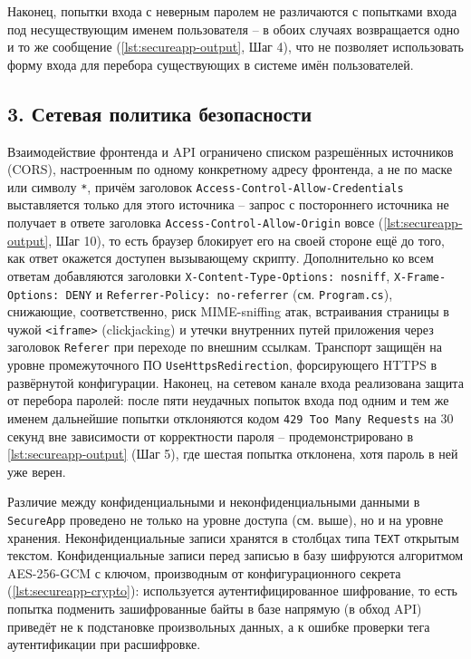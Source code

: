 Наконец, попытки входа с неверным паролем не различаются с попытками входа
под несуществующим именем пользователя -- в обоих случаях возвращается
одно и то же сообщение (\autoref{lst:secureapp-output}, Шаг 4), что не
позволяет использовать форму входа для перебора существующих в системе
имён пользователей.

\subsection*{3. Сетевая политика безопасности}

Взаимодействие фронтенда и API ограничено списком разрешённых источников
(CORS), настроенным по одному конкретному адресу фронтенда, а не по маске
или символу \texttt{*}, причём заголовок
\texttt{Access-Control-Allow-Credentials} выставляется только для этого
источника -- запрос с постороннего источника не получает в ответе заголовка
\texttt{Access-Control-Allow-Origin} вовсе (\autoref{lst:secureapp-output},
Шаг 10), то есть браузер блокирует его на своей стороне ещё до того, как
ответ окажется доступен вызывающему скрипту. Дополнительно ко всем ответам
добавляются заголовки \texttt{X-Content-Type-Options: nosniff},
\texttt{X-Frame-Options: DENY} и \texttt{Referrer-Policy: no-referrer}
(см. \texttt{Program.cs}), снижающие, соответственно, риск MIME-sniffing
атак, встраивания страницы в чужой \texttt{<iframe>} (clickjacking) и
утечки внутренних путей приложения через заголовок \texttt{Referer} при
переходе по внешним ссылкам. Транспорт защищён на уровне промежуточного ПО
\texttt{UseHttpsRedirection}, форсирующего HTTPS в развёрнутой
конфигурации. Наконец, на сетевом канале входа реализована защита от
перебора паролей: после пяти неудачных попыток входа под одним и тем же
именем дальнейшие попытки отклоняются кодом \texttt{429 Too Many Requests}
на 30 секунд вне зависимости от корректности пароля -- продемонстрировано
в \autoref{lst:secureapp-output} (Шаг 5), где шестая попытка отклонена,
хотя пароль в ней уже верен.


Различие между конфиденциальными и неконфиденциальными данными в
\texttt{SecureApp} проведено не только на уровне доступа (см. выше), но и
на уровне хранения. Неконфиденциальные записи хранятся в столбцах типа
\texttt{TEXT} открытым текстом. Конфиденциальные записи перед записью в
базу шифруются алгоритмом AES-256-GCM с ключом, производным от
конфигурационного секрета (\autoref{lst:secureapp-crypto}): используется
аутентифицированное шифрование, то есть попытка подменить
зашифрованные байты в базе напрямую (в обход API) приведёт не к
подстановке произвольных данных, а к ошибке проверки тега аутентификации
при расшифровке.

